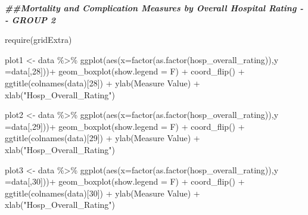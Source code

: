 \documentclass[
]{article}
\newenvironment{Shaded}{\begin{snugshade}}{\end{snugshade}}
\newcommand{\AttributeTok}[1]{\textcolor[rgb]{0.77,0.63,0.00}{#1}}
\newcommand{\DecValTok}[1]{\textcolor[rgb]{0.00,0.00,0.81}{#1}}
\newcommand{\DocumentationTok}[1]{\textcolor[rgb]{0.56,0.35,0.01}{\textbf{\textit{#1}}}}
\newcommand{\FunctionTok}[1]{\textcolor[rgb]{0.00,0.00,0.00}{#1}}
\newcommand{\NormalTok}[1]{#1}
\newcommand{\OtherTok}[1]{\textcolor[rgb]{0.56,0.35,0.01}{#1}}
\newcommand{\SpecialCharTok}[1]{\textcolor[rgb]{0.00,0.00,0.00}{#1}}
\newcommand{\StringTok}[1]{\textcolor[rgb]{0.31,0.60,0.02}{#1}}
\begin{document}
\begin{Shaded}
\begin{Highlighting}[]
\DocumentationTok{\#\#Mortality and Complication Measures by Overall Hospital Rating {-}{-} GROUP 2}

\FunctionTok{require}\NormalTok{(gridExtra)}


\NormalTok{plot1 }\OtherTok{\textless{}{-}}\NormalTok{ data }\SpecialCharTok{\%\textgreater{}\%} \FunctionTok{ggplot}\NormalTok{(}\FunctionTok{aes}\NormalTok{(}\AttributeTok{x=}\FunctionTok{factor}\NormalTok{(}\FunctionTok{as.factor}\NormalTok{(hosp\_overall\_rating)),}\AttributeTok{y =}\NormalTok{data[,}\DecValTok{28}\NormalTok{]))}\SpecialCharTok{+}
  \FunctionTok{geom\_boxplot}\NormalTok{(}\AttributeTok{show.legend =}\NormalTok{ F) }\SpecialCharTok{+}
  \FunctionTok{coord\_flip}\NormalTok{() }\SpecialCharTok{+}
  \FunctionTok{ggtitle}\NormalTok{(}\FunctionTok{colnames}\NormalTok{(data)[}\DecValTok{28}\NormalTok{]) }\SpecialCharTok{+} 
  \FunctionTok{ylab}\NormalTok{(}\StringTok{\textquotesingle{}Measure Value\textquotesingle{}}\NormalTok{) }\SpecialCharTok{+} \FunctionTok{xlab}\NormalTok{(}\StringTok{"Hosp\_Overall\_Rating"}\NormalTok{)}


\NormalTok{plot2 }\OtherTok{\textless{}{-}}\NormalTok{ data }\SpecialCharTok{\%\textgreater{}\%} \FunctionTok{ggplot}\NormalTok{(}\FunctionTok{aes}\NormalTok{(}\AttributeTok{x=}\FunctionTok{factor}\NormalTok{(}\FunctionTok{as.factor}\NormalTok{(hosp\_overall\_rating)),}\AttributeTok{y =}\NormalTok{data[,}\DecValTok{29}\NormalTok{]))}\SpecialCharTok{+}
  \FunctionTok{geom\_boxplot}\NormalTok{(}\AttributeTok{show.legend =}\NormalTok{ F) }\SpecialCharTok{+}
  \FunctionTok{coord\_flip}\NormalTok{() }\SpecialCharTok{+}
  \FunctionTok{ggtitle}\NormalTok{(}\FunctionTok{colnames}\NormalTok{(data)[}\DecValTok{29}\NormalTok{]) }\SpecialCharTok{+} 
  \FunctionTok{ylab}\NormalTok{(}\StringTok{\textquotesingle{}Measure Value\textquotesingle{}}\NormalTok{) }\SpecialCharTok{+} \FunctionTok{xlab}\NormalTok{(}\StringTok{"Hosp\_Overall\_Rating"}\NormalTok{)}

\NormalTok{plot3 }\OtherTok{\textless{}{-}}\NormalTok{ data }\SpecialCharTok{\%\textgreater{}\%} \FunctionTok{ggplot}\NormalTok{(}\FunctionTok{aes}\NormalTok{(}\AttributeTok{x=}\FunctionTok{factor}\NormalTok{(}\FunctionTok{as.factor}\NormalTok{(hosp\_overall\_rating)),}\AttributeTok{y =}\NormalTok{data[,}\DecValTok{30}\NormalTok{]))}\SpecialCharTok{+}
  \FunctionTok{geom\_boxplot}\NormalTok{(}\AttributeTok{show.legend =}\NormalTok{ F) }\SpecialCharTok{+}
  \FunctionTok{coord\_flip}\NormalTok{() }\SpecialCharTok{+}
  \FunctionTok{ggtitle}\NormalTok{(}\FunctionTok{colnames}\NormalTok{(data)[}\DecValTok{30}\NormalTok{]) }\SpecialCharTok{+} 
  \FunctionTok{ylab}\NormalTok{(}\StringTok{\textquotesingle{}Measure Value\textquotesingle{}}\NormalTok{) }\SpecialCharTok{+} \FunctionTok{xlab}\NormalTok{(}\StringTok{"Hosp\_Overall\_Rating"}\NormalTok{)}



\end{Highlighting}
\end{Shaded}
\end{document}
